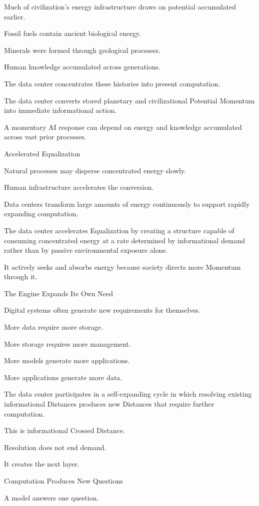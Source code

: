 Much of civilization’s energy infrastructure draws on potential accumulated earlier.

Fossil fuels contain ancient biological energy.

Minerals were formed through geological processes.

Human knowledge accumulated across generations.

The data center concentrates these histories into present computation.

The data center converts stored planetary and civilizational Potential Momentum into immediate informational action.

A momentary AI response can depend on energy and knowledge accumulated across vast prior processes.

Accelerated Equalization

Natural processes may disperse concentrated energy slowly.

Human infrastructure accelerates the conversion.

Data centers transform large amounts of energy continuously to support rapidly expanding computation.

The data center accelerates Equalization by creating a structure capable of consuming concentrated energy at a rate determined by informational demand rather than by passive environmental exposure alone.

It actively seeks and absorbs energy because society directs more Momentum through it.

The Engine Expands Its Own Need

Digital systems often generate new requirements for themselves.

More data require more storage.

More storage requires more management.

More models generate more applications.

More applications generate more data.

The data center participates in a self-expanding cycle in which resolving existing informational Distances produces new Distances that require further computation.

This is informational Crossed Distance.

Resolution does not end demand.

It creates the next layer.

Computation Produces New Questions

A model answers one question.

